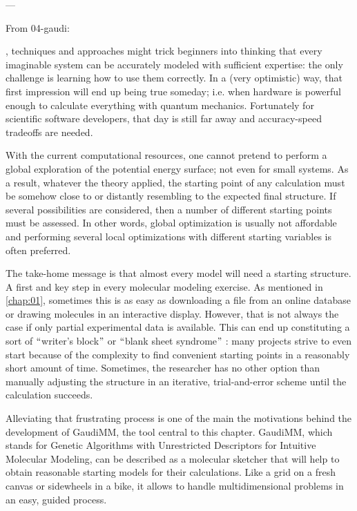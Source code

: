 ---

From 04-gaudi:

, techniques and approaches might trick beginners into thinking that every imaginable system can be accurately modeled with sufficient expertise: the only challenge is learning how to use them correctly. In a (very optimistic) way, that first impression will end up being true someday; i.e. when hardware is powerful enough to calculate everything with quantum mechanics. Fortunately for scientific software developers, that day is still far away and accuracy-speed tradeoffs are needed.

With the current computational resources, one cannot pretend to perform a global exploration of the potential energy surface; not even for small systems. As a result, whatever the theory applied, the starting point of any calculation must be somehow close to or distantly resembling to the expected final structure. If several possibilities are considered, then a number of different starting points must be assessed. In other words, global optimization is usually not affordable and performing several local optimizations with different starting variables is often preferred.

The take-home message is that almost every model will need a starting structure. A first and key step in every molecular modeling exercise. As mentioned in \autoref{chap:01}, sometimes this is as easy as downloading a file from an online database or drawing molecules in an interactive display. However, that is not always the case if only partial experimental data is available. This can end up constituting a sort of $``$writer's block$"$  or $``$blank sheet syndrome$"$ : many projects strive to even start because of the complexity to find convenient starting points in a reasonably short amount of time. Sometimes, the researcher has no other option than manually adjusting the structure in an iterative, trial-and-error scheme until the calculation succeeds.

Alleviating that frustrating process is one of the main the motivations behind the development of GaudiMM, the tool central to this chapter. GaudiMM, which stands for Genetic Algorithms with Unrestricted Descriptors for Intuitive Molecular Modeling, can be described as a molecular sketcher that will help to obtain reasonable starting models for their calculations. Like a grid on a fresh canvas or sidewheels in a bike, it allows to handle multidimensional problems in an easy, guided process.

